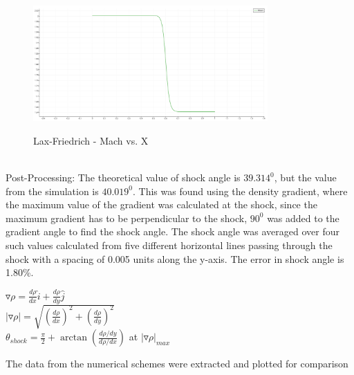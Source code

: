 \begin{figure}[H]
\centering
\includegraphics[width=0.8\textwidth]{text/Lax_M_vs_X_Inviscid_Wedge.png}\\
\caption[Lax-Friedrich - Mach vs. X]{Lax-Friedrich - Mach vs. X}
\label{fig: Lax-Friedrich - Mach vs. X}
\end{figure}
\\
Post-Processing: The theoretical value of shock angle is $39.314^0$, but the value from the simulation is $40.019^0$. This was found using the density gradient, where the maximum value of the gradient was calculated at the shock, since the maximum gradient has to be perpendicular to the shock, $90^0$ was added to the gradient angle to find the shock angle. The shock angle was averaged over four such values calculated from five different horizontal lines passing through the shock with a spacing of 0.005 units along the y-axis. The error in shock angle is 1.80\%. \\
\begin{center}
$ \triangledown \rho = \frac{d\rho}{dx} \hat{i} + \frac{d\rho}{dy} \hat{j}  $\\
$ |\triangledown \rho| = \sqrt{(\frac{d\rho}{dx})^2  + (\frac{d\rho}{dy})^2 } $ \\
$ \theta_{shock} = \frac{\pi}{2} + \arctan{(\frac{d\rho/dy}{d\rho/dx})}$ at $|\triangledown \rho|_{max} $
\end{center}
\newpage
The data from the numerical schemes were extracted and plotted for comparison
